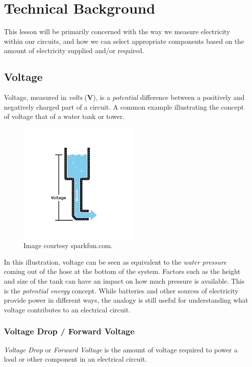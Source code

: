     \section{Technical Background}
    This lesson will be primarily concerned with the way we measure electricity within our circuits, and how we can select appropriate components based on the amount of electricity supplied and/or required.

    \subsection{Voltage}
    Voltage, measured in \emph{volts} (\textbf{V}), is a \emph{potential} difference between a positively and negatively charged part of a circuit. A common example illustrating the concept of voltage that of a water tank or tower.

    \begin{figure}[h]
        \centering
        \includegraphics[height=6cm]{Extras/voltage}
        \caption*{\small Image courtesy sparkfun.com.}
    \end{figure}
    In this illustration, voltage can be seen as equivalent to the \emph{water pressure} coming out of the hose at the bottom of the system. Factors such as the height and size of the tank can have an impact on how much pressure is available. This is the \emph{potential energy} concept. While batteries and other sources of electricity provide power in different ways, the analogy is still useful for understanding what voltage contributes to an electrical circuit.

    \subsubsection*{Voltage Drop / Forward Voltage} 
    \emph{Voltage Drop} or \emph{Forward Voltage} is the amount of voltage required to power a load or other component in an electrical circuit.

